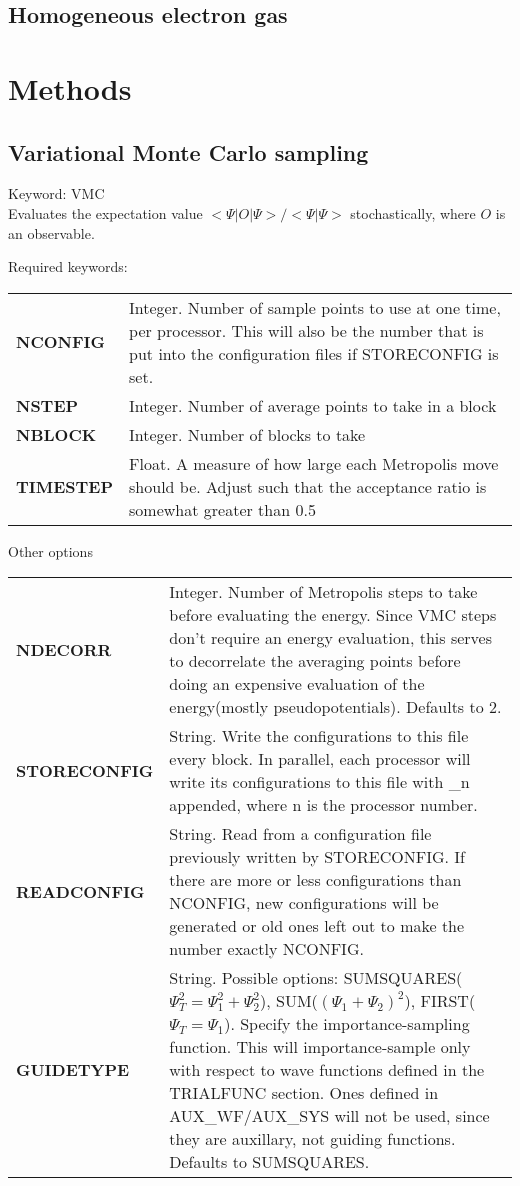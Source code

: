\documentclass[12pt]{article}
\begin{document}
\newpage
\subsection{Homogeneous electron gas}

\newpage
\section{Methods}
\subsection{Variational Monte Carlo sampling}
Keyword: VMC \\

Evaluates the expectation value $ <\Psi|O|\Psi>/<\Psi|\Psi>$
stochastically, where $O$ is an observable.

Required keywords: \\
\begin{tabular}{lp{12cm}}
{\bf NCONFIG} & Integer. Number of sample points to use at one time,
per processor.  This will also be the number that is put into the 
configuration files if STORECONFIG is set.\\
{\bf NSTEP} & Integer.  Number of average points to take in a block \\

{\bf NBLOCK} & Integer.  Number of blocks to take \\

{\bf TIMESTEP} & Float.  A measure of how large each Metropolis move
should be.  Adjust such that the acceptance ratio is somewhat greater than
0.5 \\
\end{tabular}


Other options \\
\begin{tabular}{lp{12cm}}
{\bf NDECORR} &   Integer.
       Number of Metropolis steps to take before evaluating the energy.
           Since VMC steps don't require an energy evaluation, this serves
           to decorrelate the averaging points before doing an expensive
           evaluation of the energy(mostly pseudopotentials). Defaults to 2.\\
{\bf STORECONFIG} & String.  Write the configurations to 
this file every block.  In parallel, each processor will write its configurations to this file with \_n appended, where n is the processor number. \\
{\bf READCONFIG } & String.  Read from a configuration file
previously written by STORECONFIG.  If there are more or less configurations 
than NCONFIG, new configurations will be generated or old ones left out to
make the number exactly NCONFIG. \\
{\bf GUIDETYPE} &  String.
     Possible options: SUMSQUARES($ \Psi_T^2 = \Psi_1^2+\Psi_2^2 $), 
      SUM($ (\Psi_1 + \Psi_2)^2 $), FIRST($ \Psi_T = \Psi_1 $). Specify
the importance-sampling function. This will importance-sample only
with respect to wave functions defined in the TRIALFUNC section.  Ones
defined in AUX\_WF/AUX\_SYS will not be used, since they are auxillary, not
guiding functions. Defaults to SUMSQUARES.\\
\end{tabular}
\end{document}
